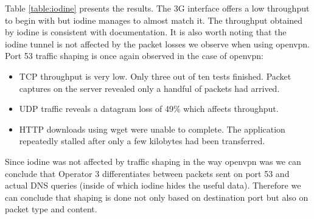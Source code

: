 Table \ref{table:iodine} presents the results. The 3G interface offers a low throughput to begin with but iodine manages to almost match it. The throughput obtained by iodine is consistent with documentation. It is also worth noting that the iodine tunnel is not affected by the packet losses we observe when using openvpn. Port 53 traffic shaping is once again observed in the case of openvpn:

\begin{itemize}
\item TCP throughput is very low. Only three out of ten tests finished. Packet captures on the server revealed only a handful of packets had arrived.
\item UDP traffic reveals a datagram loss of 49\% which affects throughput.
\item HTTP downloads using wget were unable to complete. The application repeatedly stalled after only a few kilobytes had been transferred.
\end{itemize}

Since iodine was not affected by traffic shaping in the way openvpn was we can conclude that Operator 3 differentiates between packets sent on port 53 and actual DNS queries (inside of which iodine hides the useful data). Therefore we can conclude that shaping is done not only based on destination port but also on packet type and content.